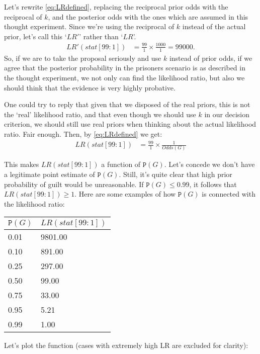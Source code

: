 \documentclass{article}
\newcommand{\pr}[1]{\mbox{$\mathtt{P}(#1)$}}
\begin{document}
Let's rewrite \eqref{eq:LRdefined}, replacing the reciprocal prior odds with the reciprocal of  $k$, and the posterior odds with the ones which are assumed in this thought experiment. Since we're using the reciprocal of $k$ instead of the actual prior, let's call this `$LR'$' rather than `$LR$'.
 \begin{align}
LR'(stat[99:1])  & = \frac{99}{1}\times \frac{1000}{1} = 99000.\label{eq:LR'}
\end{align}
\noindent So, if we are to take the proposal seriously and use $k$ instead of prior odds, if we agree that the posterior probability in the prisoners scenario is as described in the thought experiment, we not only can find the likelihood ratio, but also we should think that the evidence is very highly probative. 

One could try to reply that given that we disposed of the real priors, this is not the `real' likelihood ratio, and that even though we should use $k$ in our decision criterion, we should still use real priors when thinking about the actual likelihood ratio. Fair enough. Then, by \eqref{eq:LRdefined} we get:
 \begin{align}
LR(stat[99:1])  & = \frac{99}{1}\times \frac{1}{Odds(G)}\label{eq:LRprisoners}
\end{align} 

This makes $LR(stat[99:1])$ a function of $\pr{G}$. Let's concede we don't have a legitimate point estimate of $\pr{G}$. Still, it's quite clear that high prior probability of guilt would be unreasonable. If $\pr{G}\leq 0.99$, it follows that $LR(stat[99:1])\geq 1$. Here are some examples of how $\pr{G}$ is connected with the likelihood ratio:

\begin{center}\footnotesize
\begin{tabular}{@{}ll@{}}
  \toprule
 $\pr{G}$ & $LR(stat[99:1])$ \\ 
  \midrule
 0.01 & 9801.00 \\ 
 0.10 & 891.00 \\ 
 0.25 & 297.00 \\ 
 0.50 & 99.00 \\ 
 0.75 & 33.00 \\ 
 0.95 & 5.21 \\ 
 0.99 & 1.00 \\ 
   \bottomrule
\end{tabular}\normalsize
\end{center}

Let's plot the function (cases with extremely high LR are excluded for clarity):
\end{document}
